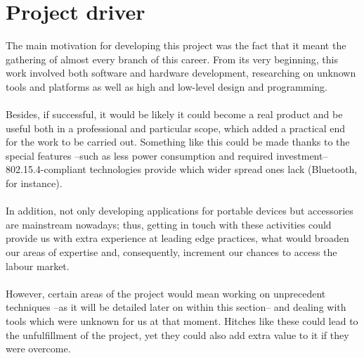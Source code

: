 	\section{Project driver}
		The main motivation for developing this project was the fact that it meant
		the gathering of almost every branch of this career. From its very beginning, this
		work involved both software and hardware development, researching on unknown 
		tools and platforms as well as high and low-level design and programming.\\\\
		Besides, if successful, it would be likely it could become a real product
		and be useful both in a professional and particular scope, which added a practical
		end for the work to be carried out. Something like this could be made thanks to
		the special features --such as less power consumption and required investment-- 802.15.4-compliant
		technologies provide which wider spread ones lack (Bluetooth, for instance).\\\\
		In addition, not only developing applications for portable devices but accessories
		are mainstream nowadays; thus, getting in touch with these activities could
		provide us with extra experience at leading edge practices, what would broaden our areas of
		expertise and, consequently, increment our chances to access the labour market.\\\\
		However, certain areas of the project would mean working on unprecedent techniques
		--as it will be detailed later on within this section-- and dealing with tools
		which were unknown for us at that moment. Hitches like these could lead to the
		unfulfillment of the project, yet they could also add extra value to it if 
		they were overcome.\\
		
